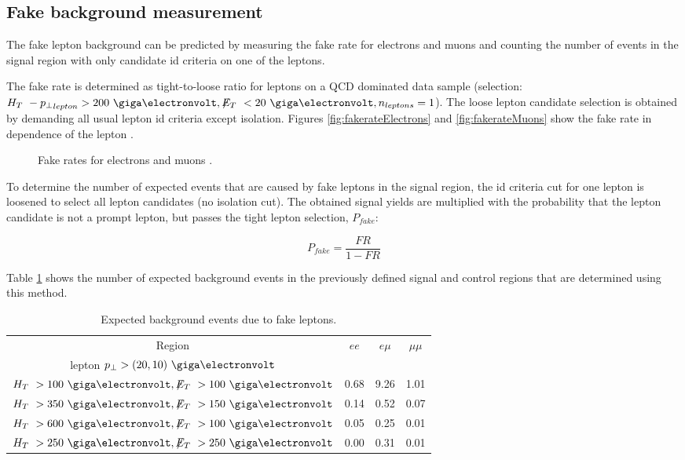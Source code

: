 \subsection{Fake background measurement}\label{sec:fakes}

The fake lepton background can be predicted by measuring the fake rate for electrons and muons and counting the number of events in the signal region with only candidate id criteria on one of the leptons.

The fake rate is determined as tight-to-loose ratio for leptons on a QCD dominated data sample (selection: $\HT - {\pT}_{lepton} > 200~\GeV, \MET < 20~\GeV, n_{leptons} = 1$). The loose lepton candidate selection is obtained by demanding all usual lepton id criteria except isolation. Figures \ref{fig:fakerateElectrons} and \ref{fig:fakerateMuons} show the fake rate in dependence of the lepton \pT.


\begin{figure}[hbtp]
  \hfill
  \hfill
  \caption{Fake rates for electrons  and muons .}
\end{figure}

To determine the number of expected events that are caused by fake leptons in the signal region, the id criteria cut for one lepton is loosened to select all lepton candidates (no isolation cut). The obtained signal yields are multiplied with the probability that the lepton candidate is not a prompt lepton, but passes the tight lepton selection, $P_{fake}$:

$$P_{fake} = \frac{FR}{1- FR}$$

Table \ref{tab:fakeYields} shows the number of expected background events in the previously defined signal and control regions that are determined using this method.

\begin{table}[hbtp]
\caption{Expected background events due to fake leptons.}
\label{tab:fakeYields}
\begin{center}
\begin{tabular}{c||c|c|c} \hline
Region   & $ee$ & $e\mu$ &  $\mu\mu$  \\
lepton $\pT > (20, 10)~\GeV$  & & & \\\hline \hline
$\HT > 100~\GeV, \MET > 100~\GeV$ &  0.68  & 9.26 & 1.01 \\
$\HT > 350~\GeV, \MET > 150~\GeV$ &  0.14  & 0.52 & 0.07 \\
$\HT > 600~\GeV, \MET > 100~\GeV$ &  0.05  & 0.25 & 0.01 \\
$\HT > 250~\GeV, \MET > 250~\GeV$ &  0.00  & 0.31 & 0.01 \\\hline
\end{tabular}
\end{center}
\end{table}
